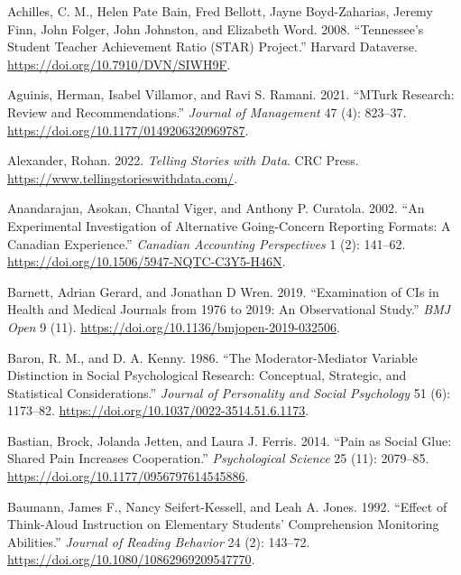 \documentclass[
  11pt,
  letterpaper,
]{scrbook}
\newlength{\cslhangindent}
\newenvironment{CSLReferences}[2] %
 {\begin{list}{}{%
  \setlength{\itemindent}{0pt}
  \setlength{\leftmargin}{0pt}
  \setlength{\parsep}{0pt}
  \ifodd #1
   \setlength{\leftmargin}{\cslhangindent}
   \setlength{\itemindent}{-1\cslhangindent}
  \fi
  \setlength{\itemsep}{#2\baselineskip}}}
 {\end{list}}
\theoremstyle{definition}
\theoremstyle{definition}
\theoremstyle{remark}
\begin{document}
\label{refs}
\begin{CSLReferences}{1}{0}
Achilles, C. M., Helen Pate Bain, Fred Bellott, Jayne Boyd-Zaharias,
Jeremy Finn, John Folger, John Johnston, and Elizabeth Word. 2008.
{``Tennessee's Student Teacher Achievement Ratio (STAR) Project.''}
Harvard Dataverse. \url{https://doi.org/10.7910/DVN/SIWH9F}.

Aguinis, Herman, Isabel Villamor, and Ravi S. Ramani. 2021. {``{MT}urk
Research: Review and Recommendations.''} \emph{Journal of Management} 47
(4): 823--37. \url{https://doi.org/10.1177/0149206320969787}.

Alexander, Rohan. 2022. \emph{Telling Stories with Data}. CRC Press.
\url{https://www.tellingstorieswithdata.com/}.

Anandarajan, Asokan, Chantal Viger, and Anthony P. Curatola. 2002. {``An
Experimental Investigation of Alternative Going-Concern Reporting
Formats: A {C}anadian Experience.''} \emph{Canadian Accounting
Perspectives} 1 (2): 141--62.
\url{https://doi.org/10.1506/5947-NQTC-C3Y5-H46N}.

Barnett, Adrian Gerard, and Jonathan D Wren. 2019. {``Examination of
{CI}s in Health and Medical Journals from 1976 to 2019: An Observational
Study.''} \emph{BMJ Open} 9 (11).
\url{https://doi.org/10.1136/bmjopen-2019-032506}.

Baron, R. M., and D. A. Kenny. 1986. {``The Moderator-Mediator Variable
Distinction in Social Psychological Research: Conceptual, Strategic, and
Statistical Considerations.''} \emph{Journal of Personality and Social
Psychology} 51 (6): 1173--82.
\url{https://doi.org/10.1037/0022-3514.51.6.1173}.

Bastian, Brock, Jolanda Jetten, and Laura J. Ferris. 2014. {``Pain as
Social Glue: Shared Pain Increases Cooperation.''} \emph{Psychological
Science} 25 (11): 2079--85.
\url{https://doi.org/10.1177/0956797614545886}.

Baumann, James F., Nancy Seifert-Kessell, and Leah A. Jones. 1992.
{``Effect of Think-Aloud Instruction on Elementary Students'
Comprehension Monitoring Abilities.''} \emph{Journal of Reading
Behavior} 24 (2): 143--72.
\url{https://doi.org/10.1080/10862969209547770}.


\end{CSLReferences}
\end{document}
